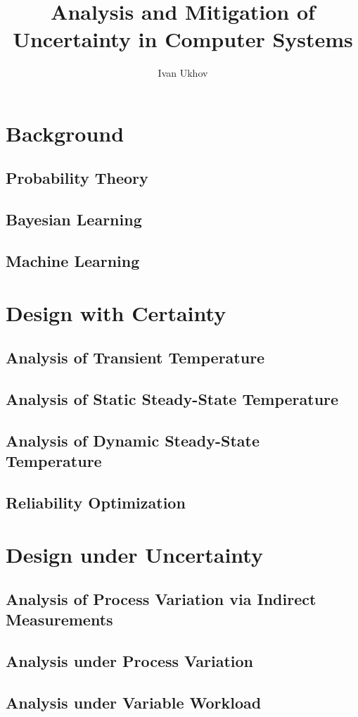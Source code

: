 \documentclass[english]{style}
\title{
  Analysis and Mitigation of\\[0.3em]
  Uncertainty in Computer Systems
}
\author{Ivan Ukhov}
\begin{document}


\chapter{Background}
\section{Probability Theory}
\section{Bayesian Learning}
\section{Machine Learning}

\chapter{Design with Certainty}
\section{Analysis of Transient Temperature}
\section{Analysis of Static Steady-State Temperature}
\section{Analysis of Dynamic Steady-State Temperature}
\section{Reliability Optimization}

\chapter{Design under Uncertainty}
\section{Analysis of Process Variation via Indirect Measurements}
\section{Analysis under Process Variation}
\section{Analysis under Variable Workload}
\end{document}
